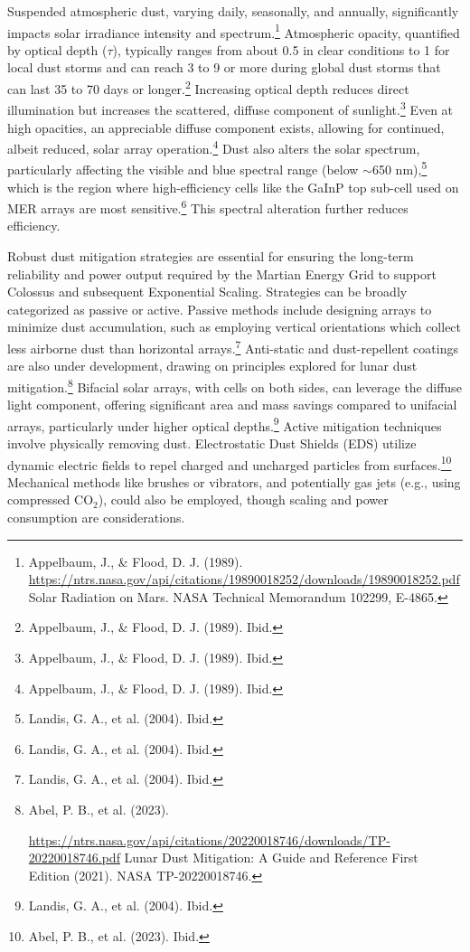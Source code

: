 \documentclass[fontsize=10pt, oneside, DIV=calc]{scrartcl}
\begin{document}
\noindent
Suspended atmospheric dust, varying daily, seasonally, and annually, significantly impacts solar irradiance intensity and spectrum.\footnote{Appelbaum, J., \& Flood, D. J. (1989). 
\href{https://ntrs.nasa.gov/api/citations/19890018252/downloads/19890018252.pdf}{https://ntrs.nasa.gov/api/citations/19890018252/downloads/19890018252.pdf} Solar Radiation on Mars. NASA Technical Memorandum 102299, E-4865.} Atmospheric opacity, quantified by optical depth ($\tau$), typically ranges from about 0.5 in clear conditions to 1 for local dust storms and can reach 3 to 9 or more during global dust storms that can last 35 to 70 days or longer.\footnote{Appelbaum, J., \& Flood, D. J. (1989). Ibid.} Increasing optical depth reduces direct illumination but increases the scattered, diffuse component of sunlight.\footnote{Appelbaum, J., \& Flood, D. J. (1989). Ibid.} Even at high opacities, an appreciable diffuse component exists, allowing for continued, albeit reduced, solar array operation.\footnote{Appelbaum, J., \& Flood, D. J. (1989). Ibid.} Dust also alters the solar spectrum, particularly affecting the visible and blue spectral range (below $\sim$650 nm),\footnote{Landis, G. A., et al. (2004). Ibid.} which is the region where high-efficiency cells like the GaInP top sub-cell used on MER arrays are most sensitive.\footnote{Landis, G. A., et al. (2004). Ibid.} This spectral alteration further reduces efficiency.
\medskip

\noindent
Robust dust mitigation strategies are essential for ensuring the long-term reliability and power output required by the Martian Energy Grid to support Colossus and subsequent Exponential Scaling. Strategies can be broadly categorized as passive or active. Passive methods include designing arrays to minimize dust accumulation, such as employing vertical orientations which collect less airborne dust than horizontal arrays.\footnote{Landis, G. A., et al. (2004). Ibid.} Anti-static and dust-repellent coatings are also under development, drawing on principles explored for lunar dust mitigation.\footnote{Abel, P. B., et al. (2023). 







\href{https://ntrs.nasa.gov/api/citations/20220018746/downloads/TP-20220018746.pdf}\url{https://ntrs.nasa.gov/api/citations/20220018746/downloads/TP-20220018746.pdf} Lunar Dust Mitigation: A Guide and Reference First Edition (2021). NASA TP-20220018746.} Bifacial solar arrays, with cells on both sides, can leverage the diffuse light component, offering significant area and mass savings compared to unifacial arrays, particularly under higher optical depths.\footnote{Landis, G. A., et al. (2004). Ibid.} Active mitigation techniques involve physically removing dust. Electrostatic Dust Shields (EDS) utilize dynamic electric fields to repel charged and uncharged particles from surfaces.\footnote{Abel, P. B., et al. (2023). Ibid.} Mechanical methods like brushes or vibrators, and potentially gas jets (e.g., using compressed CO$_2$), could also be employed, though scaling and power consumption are considerations.
\end{document}
